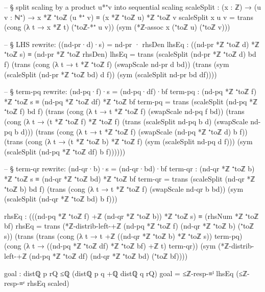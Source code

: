 \documentclass[11pt,a4paper]{book}
\begin{document}
\begin{code}
    -- § split scaling by a product u*⁺v into sequential scaling
    scaleSplit : (x : ℤ) → (u v : ℕ⁺) → x *ℤ ⁺toℤ (u *⁺ v) ≡ (x *ℤ ⁺toℤ u) *ℤ ⁺toℤ v
    scaleSplit x u v =
      trans
        (cong (λ t → x *ℤ t) (⁺toℤ-*⁺ u v))
        (sym (*ℤ-assoc x (⁺toℤ u) (⁺toℤ v)))

    -- § LHS rewrite: ((nd-pr·d)·s) = nd-pr · rhsDen
    lhsEq : ((nd-pr *ℤ ⁺toℤ d) *ℤ ⁺toℤ s) ≡ (nd-pr *ℤ ⁺toℤ rhsDen)
    lhsEq =
      trans
        (scaleSplit (nd-pr *ℤ ⁺toℤ d) bd f)
        (trans
          (cong (λ t → t *ℤ ⁺toℤ f) (swapScale nd-pr d bd))
          (trans
            (sym (scaleSplit (nd-pr *ℤ ⁺toℤ bd) d f))
            (sym (scaleSplit nd-pr bd df))))

    -- § term-pq rewrite: (nd-pq·f)·s = (nd-pq·df)·bf
    term-pq : (nd-pq *ℤ ⁺toℤ f) *ℤ ⁺toℤ s ≡ (nd-pq *ℤ ⁺toℤ df) *ℤ ⁺toℤ bf
    term-pq =
      trans
        (scaleSplit (nd-pq *ℤ ⁺toℤ f) bd f)
        (trans
          (cong (λ t → t *ℤ ⁺toℤ f) (swapScale nd-pq f bd))
          (trans
            (cong (λ t → (t *ℤ ⁺toℤ f) *ℤ ⁺toℤ f)
              (trans
                (scaleSplit nd-pq b d)
                (swapScale nd-pq b d)))
            (trans
              (cong (λ t → t *ℤ ⁺toℤ f)
                (swapScale (nd-pq *ℤ ⁺toℤ d) b f))
              (trans
                (cong (λ t → (t *ℤ ⁺toℤ b) *ℤ ⁺toℤ f) (sym (scaleSplit nd-pq d f)))
                (sym (scaleSplit (nd-pq *ℤ ⁺toℤ df) b f))))))

    -- § term-qr rewrite: (nd-qr·b)·s = (nd-qr·bd)·bf
    term-qr : (nd-qr *ℤ ⁺toℤ b) *ℤ ⁺toℤ s ≡ (nd-qr *ℤ ⁺toℤ bd) *ℤ ⁺toℤ bf
    term-qr =
      trans
        (scaleSplit (nd-qr *ℤ ⁺toℤ b) bd f)
        (trans
          (cong (λ t → t *ℤ ⁺toℤ f) (swapScale nd-qr b bd))
          (sym (scaleSplit (nd-qr *ℤ ⁺toℤ bd) b f)))

    rhsEq : (((nd-pq *ℤ ⁺toℤ f) +ℤ (nd-qr *ℤ ⁺toℤ b)) *ℤ ⁺toℤ s) ≡ (rhsNum *ℤ ⁺toℤ bf)
    rhsEq =
      trans
        (*ℤ-distrib-left-+ℤ (nd-pq *ℤ ⁺toℤ f) (nd-qr *ℤ ⁺toℤ b) (⁺toℤ s))
        (trans
          (trans
            (cong (λ t → t +ℤ ((nd-qr *ℤ ⁺toℤ b) *ℤ ⁺toℤ s)) term-pq)
            (cong (λ t → ((nd-pq *ℤ ⁺toℤ df) *ℤ ⁺toℤ bf) +ℤ t) term-qr))
          (sym (*ℤ-distrib-left-+ℤ (nd-pq *ℤ ⁺toℤ df) (nd-qr *ℤ ⁺toℤ bd) (⁺toℤ bf))))

    goal : distℚ p rQ ≤ℚ (distℚ p q +ℚ distℚ q rQ)
    goal =
      ≤ℤ-resp-≡ˡ lhsEq
        (≤ℤ-resp-≡ʳ rhsEq scaled)
\end{code}

\end{document}
